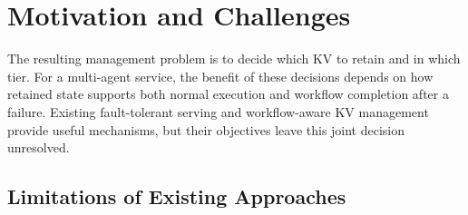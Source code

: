\section{Motivation and Challenges}
\label{sec:motivation}

The resulting management problem is to decide which KV to retain and
in which tier. For a multi-agent service, the benefit of these decisions
depends on how retained state supports both normal execution and workflow
completion after a failure. Existing fault-tolerant serving and
workflow-aware KV management provide useful mechanisms, but their
objectives leave this joint decision unresolved.

\subsection{Limitations of Existing Approaches}
\label{sec:motivation-limitations}

